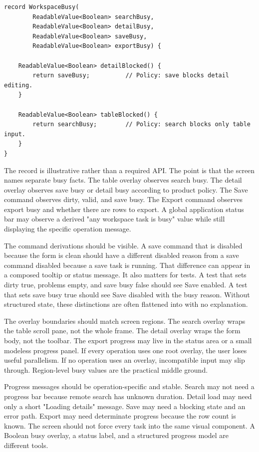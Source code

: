 \begin{lstlisting}[caption={Four operations, four busy policies.}]
record WorkspaceBusy(
        ReadableValue<Boolean> searchBusy,
        ReadableValue<Boolean> detailBusy,
        ReadableValue<Boolean> saveBusy,
        ReadableValue<Boolean> exportBusy) {

    ReadableValue<Boolean> detailBlocked() {
        return saveBusy;          // Policy: save blocks detail editing.
    }

    ReadableValue<Boolean> tableBlocked() {
        return searchBusy;        // Policy: search blocks only table input.
    }
}
\end{lstlisting}

The record is illustrative rather than a required API. The point is that the
screen names separate busy facts. The table overlay observes search busy. The
detail overlay observes save busy or detail busy according to product policy.
The Save command observes dirty, valid, and save busy. The Export command
observes export busy and whether there are rows to export. A global application
status bar may observe a derived "any workspace task is busy" value while still
displaying the specific operation message.

The command derivations should be visible. A save command that is disabled
because the form is clean should have a different disabled reason from a save
command disabled because a save task is running. That difference can appear in
a composed tooltip or status message. It also matters for tests. A test that
sets dirty true, problems empty, and save busy false should see Save enabled.
A test that sets save busy true should see Save disabled with the busy reason.
Without structured state, these distinctions are often flattened into
 with no explanation.

The overlay boundaries should match screen regions. The search overlay wraps
the table scroll pane, not the whole frame. The detail overlay wraps the form
body, not the toolbar. The export progress may live in the status area or a
small modeless progress panel. If every operation uses one root overlay, the
user loses useful parallelism. If no operation uses an overlay, incompatible
input may slip through. Region-level busy values are the practical middle
ground.

Progress messages should be operation-specific and stable. Search may not need
a progress bar because remote search has unknown duration. Detail load may need
only a short "Loading details" message. Save may need a blocking state and an
error path. Export may need determinate progress because the row count is known.
The screen should not force every task into the same visual component. A
Boolean busy overlay, a status label, and a structured progress model are
different tools.

